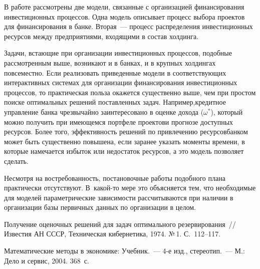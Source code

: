 \begin{multicols}{2}
\vspace*{-6pt}
     
     В работе рассмотрены две модели, связанные с организацией 
финансирования инвестиционных процессов. Одна модель описывает 
процесс выбора проектов для финансирования в банке. Вторая~--- процесс 
распределения инвестиционных ресурсов между предприятиями, входящими 
в состав холдинга. 
     
     Задачи, встающие при организации инвестиционных процессов, 
подобные рассмотренным выше, возникают и в банках, и в крупных 
холдингах повсеместно. Если реализовать приведенные модели в 
соответствующих интерактивных системах для организации финансирования 
инвестиционных процессов, то практическая польза окажется существенно 
выше, чем при простом поиске оптимальных решений поставленных задач. 
Например,\linebreak кредитное управление банка чрезвычайно заин\-тересовано в 
оценке дохода ($\omega^*$), который можно получить при имеющемся 
портфеле проектов\linebreak и прогнозе доступных ресурсов. Более того, 
эффективность решений по привлечению ресурсов\linebreak банком может быть 
существенно повышена, если заранее указать моменты времени, в которые 
намечается избыток или недостаток ресурсов, а это модель позволяет 
сделать. 
     
     Несмотря на востребованность, постановочные работы подобного 
плана практически отсутствуют. В~какой-то мере это объясняется тем, что 
необходимые для моделей параметрические зависимости рассчитываются 
при наличии в организации базы первичных данных по организации в целом.

\vspace*{-14pt}

{\small\frenchspacing
{%
\begin{thebibliography}{9}

\vspace*{-2pt}

Получение оценочных решений для задач оптимального резервирования~// Известия АН 
СССР, Техническая кибернетика, 1974. №\,1. С.~112--117.


 \label{end\stat}

Математические методы в экономике: Учебник.~--- 4-е изд., стереотип.~--- М.: Дело и сервис, 
2004. 368~с.
 \end{thebibliography}
}
}


\end{multicols}  